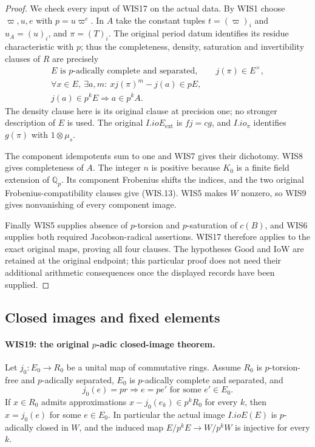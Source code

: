 \begin{proof}
We check every input of WIS17 on the actual data.
By WIS1 choose $\varpi,u,e$ with $p=u\varpi^e$.
In $A$ take the constant tuples $t=(\varpi)_i$ and
$u_A=(u)_i$, and $\pi=(T)_i$.
The original period datum identifies its residue
characteristic with $p$; thus the completeness,
density, saturation and invertibility clauses of
$R$ are precisely
\[
 \begin{gathered}
 E\text{ is }p\text{-adically complete and separated},
 \qquad j(\pi)\in E^\times,\\
 \forall x\in E,\ \exists a,m:\ xj(\pi)^m-j(a)\in pE,\\
 j(a)\in p^kE\Longrightarrow a\in p^kA .
 \end{gathered}                                            \tag{WIS.28}
\]
The density clause here is its original clause at
precision one; no stronger description of $E$ is used.
The original $I.ioE_{\mathrm{ext}}$ is $fj=cg$, and
$I.io_\pi$ identifies $g(\pi)$ with $1\otimes\mu_s$.

The component idempotents sum to one and WIS7 gives
their dichotomy. WIS8 gives completeness of $A$.
The integer $n$ is positive because $K_0$ is a finite
field extension of $\mathbb Q_p$. Its component
Frobenius shifts the indices, and the two original
Frobenius-compatibility clauses give (WIS.13).
WIS5 makes $W$ nonzero, so WIS9 gives nonvanishing
of every component image.

Finally WIS5 supplies absence of $p$-torsion and
$p$-saturation of $c(B)$, and WIS6 supplies both
required Jacobson-radical assertions. WIS17 therefore
applies to the exact original maps, proving all four
clauses. The hypotheses $\mathrm{Good}$ and
$\mathrm{IoW}$ are retained at the original endpoint;
this particular proof does not need their additional
arithmetic consequences once the displayed records
have been supplied.
\end{proof}

\subsection{Closed images and fixed elements}

\paragraph{WIS19: the original $p$-adic closed-image theorem.}
\label{claim:WIS19}
Let $j_0:E_0\to R_0$ be a unital map of commutative rings.
Assume $R_0$ is $p$-torsion-free and $p$-adically separated,
$E_0$ is $p$-adically complete and separated, and
\[
 j_0(e)=pr\Longrightarrow e=pe'
                              \text{ for some }e'\in E_0. \tag{WIS.29}
\]
If $x\in R_0$ admits approximations
$x-j_0(e_k)\in p^kR_0$ for every $k$, then
$x=j_0(e)$ for some $e\in E_0$.
In particular the actual image $I.ioE(E)$ is $p$-adically
closed in $W$, and the induced map
$E/p^kE\to W/p^kW$ is injective for every $k$.

